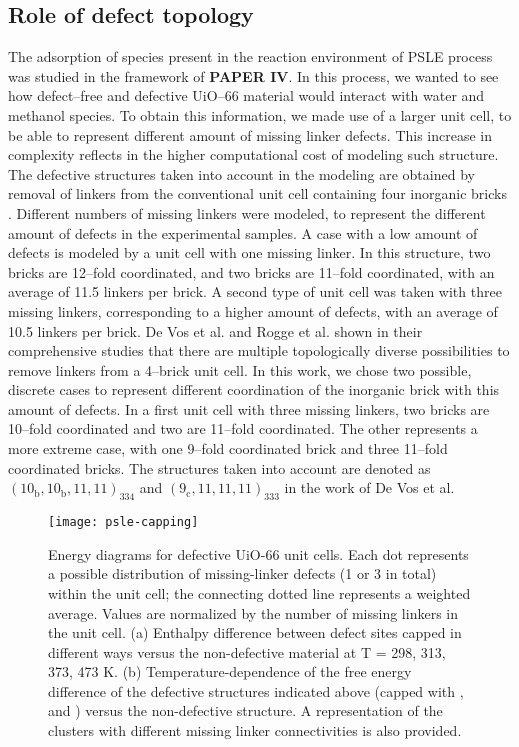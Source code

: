 \subsection{Role of defect topology}
The adsorption of species present in the reaction environment of PSLE process was studied in the framework of \textbf{PAPER IV}. In this process, we wanted to see how defect--free and defective UiO--66 material would interact with water and methanol species. To obtain this information, we made use of a larger unit cell, to be able to represent different amount of missing linker defects. This increase in complexity reflects in the higher computational cost of modeling such structure. The defective structures taken into account in the modeling are obtained by removal of linkers from the conventional unit cell containing four inorganic  bricks \cite{cavka2008new}. Different numbers of missing linkers were modeled, to represent the different amount of defects in the experimental samples. A case with a low amount of defects is modeled by a unit cell with one missing linker. In this structure, two bricks are 12--fold coordinated, and two bricks are 11--fold coordinated, with an average of 11.5 linkers per brick. A second type of unit cell was taken with three missing linkers, corresponding to a higher amount of defects, with an average of 10.5 linkers per brick. De Vos et al. and Rogge et al.\cite{devos2017missing, rogge2016thermodynamic} shown in their comprehensive studies that there are multiple topologically diverse possibilities to remove linkers from a 4--brick unit cell. In this work, we chose two possible, discrete cases to represent different coordination of the inorganic brick with this amount of defects. In a first unit cell with three missing linkers, two bricks are 10--fold coordinated and two are 11--fold coordinated. The other represents a more extreme case, with one 9--fold coordinated brick and three 11--fold coordinated bricks. The structures taken into account are denoted as $\mathrm{(10_{b}, 10_{b}, 11, 11)_{334}}$ and $\mathrm{(9_{c}, 11, 11, 11)_{333}}$ in the work of De Vos et al. 
%
\begin{figure}[!htbp]
	\centering
	\texttt{[image: psle-capping]}
	\caption{Energy diagrams for defective UiO-66 unit cells. Each dot represents a possible distribution of missing-linker defects (1 or 3 in total) within the unit cell; the connecting dotted line represents a weighted average. Values are normalized by the number of missing linkers in the unit cell. (a) Enthalpy difference between defect sites capped in different ways versus the non-defective material at T = 298, 313, 373, 473 K. (b) Temperature-dependence of the free energy difference of the defective structures indicated above (capped with ,  and ) versus the non-defective structure. A representation of the clusters with different missing linker connectivities is also provided.}
	\label{fig:psle-capping}
\end{figure}

